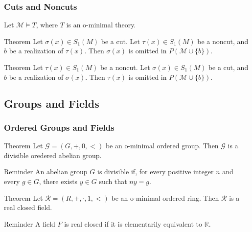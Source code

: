 \begin{frame}[c]\frametitle{Cuts and Noncuts}

	Let $\mathcal{M} \vDash T$, where $T$ is an o-minimal theory.
    \break
    \break
	\begin{beamerboxesrounded}[shadow=true]{Theorem}
		Let $\sigma (x) \in S_1 (M)$ be a cut. 
		Let $\tau (x) \in S_1 (M)$ be a noncut, and $b$ be a realization of $\tau (x)$.
		Then $\sigma (x)$ is omitted in $P(\mathcal{M} \cup \{b\})$.
	\end{beamerboxesrounded}

	\begin{beamerboxesrounded}[shadow=true]{Theorem}
		Let $\tau (x) \in S_1 (M)$ be a noncut. 
		Let $\sigma (x) \in S_1 (M)$ be a cut, and $b$ be a realization of $\sigma (x)$.
		Then $\tau (x)$ is omitted in $P(\mathcal{M} \cup \{b\})$.
	\end{beamerboxesrounded}

\end{frame}

\subsection{Groups and Fields}

\begin{frame}[t]\frametitle{Ordered Groups and Fields}
    
	\begin{beamerboxesrounded}[shadow=true]{Theorem}
		Let $\mathcal{G}=(G,+,0,<)$ be an o-minimal ordered group. 
		Then $\mathcal{G}$ is a divisible oredered abelian group.
	\end{beamerboxesrounded}

	\begin{beamerboxesrounded}[shadow=true]{Reminder}
		An abelian group $G$ is divisible if, for every positive integer $n$ and every $g \in G$, there exists $y \in G$ such that $ny = g$.
	\end{beamerboxesrounded}

	\begin{beamerboxesrounded}[shadow=true]{Theorem}
		Let $\mathcal{R}=(R,+,\cdot,1,<)$ be an o-minimal ordered ring. 
		Then $\mathcal{R}$ is a real closed field.
	\end{beamerboxesrounded}

	\begin{beamerboxesrounded}[shadow=true]{Reminder}
		A field $F$ is real closed if it is elementarily equivalent to $\mathbb{R}$.
	\end{beamerboxesrounded}

\end{frame}

